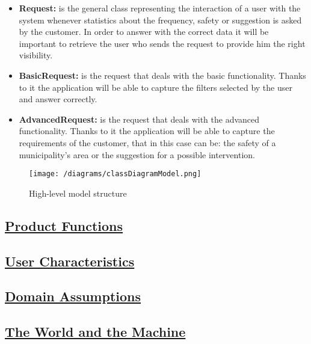 \begin{itemize}
		\item \textbf{Request:} is the general class representing the interaction of a user with the system whenever statistics about the frequency, safety or suggestion is asked by the customer. In order to answer with the correct data it will be important to retrieve the user who sends the request to provide him the right visibility.
		
		\item \textbf{BasicRequest:} is the request that deals with the basic functionality. Thanks to it the application will be able to capture the filters selected by the user and answer correctly.
		
		\item \textbf{AdvancedRequest:} is the request that deals with the advanced functionality. Thanks to it the application will be able to capture the requirements of the customer, that in this case can be: the safety of a municipality's area or the suggestion for a possible intervention.
	\end{itemize}
	
	\begin{figure}[h!]
		\texttt{[image: /diagrams/classDiagramModel.png]}
		\caption{\label{fig:classDiagram}High-level model structure}
	\end{figure}

	\FloatBarrier

\subsection[Product Functions]{\hyperlink{toc}{Product Functions}}

\subsection[User Characteristics]{\hyperlink{toc}{User Characteristics}}

\subsection[Domain Assumptions]{\hyperlink{toc}{Domain Assumptions}}

\subsection[The World and the Machine]{\hyperlink{toc}{The World and the Machine}}
